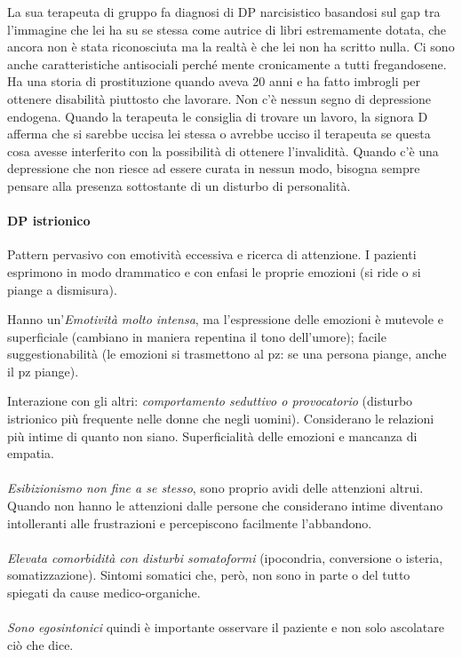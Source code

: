 \begin{itemize}
La sua terapeuta di gruppo fa diagnosi di DP narcisistico basandosi sul
gap tra l'immagine che lei ha su se stessa come autrice di libri
estremamente dotata, che ancora non è stata riconosciuta ma la realtà è
che lei non ha scritto nulla. Ci sono anche caratteristiche antisociali
perché mente cronicamente a tutti fregandosene. Ha una storia di
prostituzione quando aveva 20 anni e ha fatto imbrogli per ottenere
disabilità piuttosto che lavorare. Non c'è nessun segno di depressione
endogena. Quando la terapeuta le consiglia di trovare un lavoro, la
signora D afferma che si sarebbe uccisa lei stessa o avrebbe ucciso il
terapeuta se questa cosa avesse interferito con la possibilità di
ottenere l'invalidità. Quando c'è una depressione che non riesce ad
essere curata in nessun modo, bisogna sempre pensare alla presenza
sottostante di un disturbo di personalità.
\end{itemize}

\paragraph{DP istrionico}

Pattern pervasivo con emotività eccessiva e ricerca di attenzione. I
pazienti esprimono in modo drammatico e con enfasi le proprie emozioni
(si ride o si piange a dismisura).

Hanno un'\emph{Emotività molto intensa}, ma l'espressione delle emozioni
è mutevole e superficiale (cambiano in maniera repentina il tono
dell'umore); facile suggestionabilità (le emozioni si trasmettono al pz:
se una persona piange, anche il pz piange).

Interazione con gli altri: \emph{comportamento seduttivo o provocatorio}
(disturbo istrionico più frequente nelle donne che negli uomini).
Considerano le relazioni più intime di quanto non siano. Superficialità
delle emozioni e mancanza di empatia.
\\\\
\emph{Esibizionismo non fine a se stesso}, sono proprio avidi delle
attenzioni altrui. Quando non hanno le attenzioni dalle persone che
considerano intime diventano intolleranti alle frustrazioni e
percepiscono facilmente l'abbandono.
\\\\
\emph{Elevata comorbidità con disturbi somatoformi} (ipocondria,
conversione o isteria, somatizzazione). Sintomi somatici che, però, non
sono in parte o del tutto spiegati da cause medico-organiche.
\\\\
\emph{Sono egosintonici} quindi è importante osservare il paziente e non
solo ascolatare ciò che dice.

